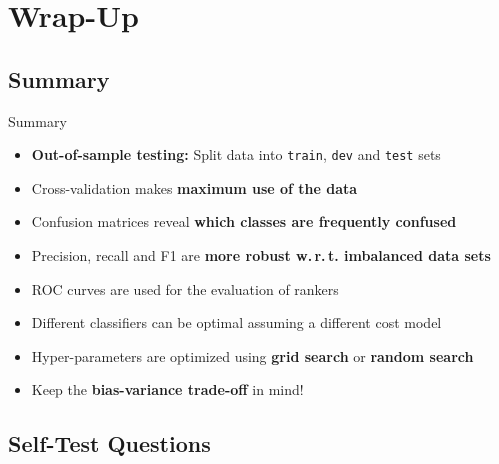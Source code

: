 \section{Wrap-Up}

\subsection{Summary}

\begin{frame}{Summary}{}
	\begin{itemize}
		\item \textbf{Out-of-sample testing:} Split data into \texttt{train}, \texttt{dev} and \texttt{test} sets
		\item Cross-validation makes \textbf{maximum use of the data}
		\item Confusion matrices reveal \textbf{which classes are frequently confused}
		\item Precision, recall and F1 are \textbf{more robust w.\,r.\,t. imbalanced data sets}
		\item ROC curves are used for the evaluation of rankers
		\item Different classifiers can be optimal assuming a different cost model
		\item Hyper-parameters are optimized using \textbf{grid search} or \textbf{random search}
		\item Keep the \textbf{bias-variance trade-off} in mind!
	\end{itemize}
\end{frame}


\subsection{Self-Test Questions}

